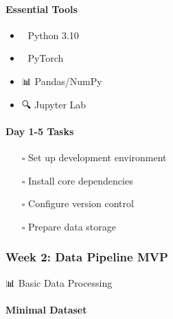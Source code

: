 \paragraph{Essential Tools}\label{essential-tools}

\begin{itemize}
\tightlist
\item
  🐍 Python 3.10
\item
  🤖 PyTorch
\item
  📊 Pandas/NumPy
\item
  🔍 Jupyter Lab
\end{itemize}

\paragraph{Day 1-5 Tasks}\label{day-1-5-tasks}

\begin{itemize}
\tightlist
\item[$\square$]
  Set up development environment
\item[$\square$]
  Install core dependencies
\item[$\square$]
  Configure version control
\item[$\square$]
  Prepare data storage
\end{itemize}

\subsubsection{Week 2: Data Pipeline
MVP}\label{week-2-data-pipeline-mvp}

📊 Basic Data Processing

\paragraph{Minimal Dataset}\label{minimal-dataset}

\begin{Shaded}
\begin{Highlighting}[]
     \NormalTok{(}\NormalTok{):}
        \OperatorTok{=}\NormalTok{ []}
        \OperatorTok{=}\NormalTok{ \{\}}

\end{Highlighting}
\end{Shaded}

